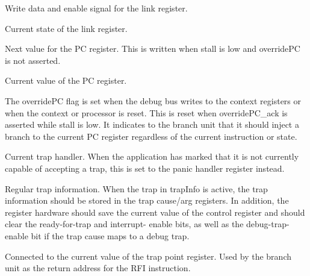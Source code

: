 \ifaceSubGroup{}
Write data and enable signal for the link register.
    
\ifaceSubGroup{}
Current state of the link register.

\ifaceSubGroup{}
Next value for the PC register. This is written when stall is low and overridePC 
is not asserted.

\ifaceSubGroup{}
Current value of the PC register.

\ifaceSubGroup{}
The overridePC flag is set when the debug bus writes to the context registers or 
when the context or processor is reset. This is reset when overridePC_ack is 
asserted while stall is low. It indicates to the branch unit that it should 
inject a branch to the current PC register regardless of the current instruction 
or state.

\ifaceSubGroup{}
Current trap handler. When the application has marked that it is not currently 
capable of accepting a trap, this is set to the panic handler register instead.

\ifaceSubGroup{}
Regular trap information. When the trap in trapInfo is active, the trap 
information should be stored in the trap cause/arg registers. In addition, the 
register hardware should save the current value of the control register and 
should clear the ready-for-trap and interrupt- enable bits, as well as the 
debug-trap-enable bit if the trap cause maps to a debug trap.

\ifaceSubGroup{}
Connected to the current value of the trap point register. Used by the branch 
unit as the return address for the RFI instruction.

